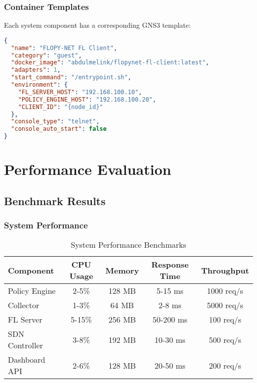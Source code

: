 \documentclass[12pt,a4paper,twoside]{article}
\begin{document}
\subsubsection{Container Templates}

Each system component has a corresponding GNS3 template:

\begin{lstlisting}[language=json, caption=GNS3 Node Template Example]
{
  "name": "FLOPY-NET FL Client",
  "category": "guest",
  "docker_image": "abdulmelink/flopynet-fl-client:latest",
  "adapters": 1,
  "start_command": "/entrypoint.sh",
  "environment": {
    "FL_SERVER_HOST": "192.168.100.10",
    "POLICY_ENGINE_HOST": "192.168.100.20",
    "CLIENT_ID": "{node_id}"
  },
  "console_type": "telnet",
  "console_auto_start": false
}
\end{lstlisting}

\section{Performance Evaluation}

\subsection{Benchmark Results}

\subsubsection{System Performance}

\begin{table}[H]
\centering
\begin{tabular}{@{}lcccc@{}}
\toprule
\textbf{Component} & \textbf{CPU Usage} & \textbf{Memory} & \textbf{Response Time} & \textbf{Throughput} \\
\midrule
Policy Engine & 2-5\% & 128 MB & 5-15 ms & 1000 req/s \\
Collector & 1-3\% & 64 MB & 2-8 ms & 5000 req/s \\
FL Server & 5-15\% & 256 MB & 50-200 ms & 100 req/s \\
SDN Controller & 3-8\% & 192 MB & 10-30 ms & 500 req/s \\
Dashboard API & 2-6\% & 128 MB & 20-50 ms & 200 req/s \\
\bottomrule
\end{tabular}
\caption{System Performance Benchmarks}
\label{tab:performance}
\end{table}
\end{document}
